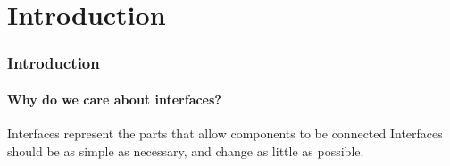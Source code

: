 \section{Introduction}

\begin{frame}
\frametitle{Introduction}
\framesubtitle{Why do we care about interfaces?}

\begin{block}{Interfaces represent the parts that allow components to be connected}
Interfaces should be as simple as necessary, and change as little as possible.
\end{block}
\end{frame}
